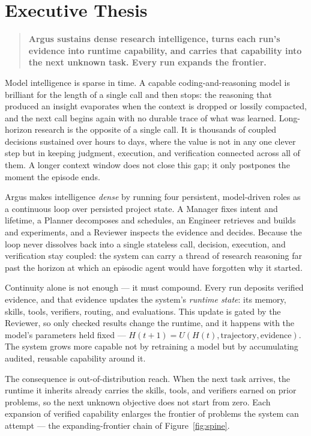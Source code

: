 \section{Executive Thesis}
\label{sec:thesis}

\begin{quote}
\large\bfseries
Argus sustains dense research intelligence, turns each run's evidence into
runtime capability, and carries that capability into the next unknown task.
Every run expands the frontier.
\end{quote}

Model intelligence is sparse in time. A capable coding-and-reasoning model is
brilliant for the length of a single call and then stops: the reasoning that
produced an insight evaporates when the context is dropped or lossily compacted,
and the next call begins again with no durable trace of what was learned. Long-horizon
research is the opposite of a single call. It is thousands of coupled decisions
sustained over hours to days, where the value is not in any one clever step but in
keeping judgment, execution, and verification connected across all of them. A
longer context window does not close this gap; it only postpones the moment the
episode ends.

Argus makes intelligence \emph{dense} by running four persistent, model-driven
roles as a continuous loop over persisted project state. A Manager fixes intent
and lifetime, a Planner decomposes and schedules, an Engineer retrieves and builds
and experiments, and a Reviewer inspects the evidence and decides. Because the
loop never dissolves back into a single stateless call, decision, execution, and
verification stay coupled: the system can carry a thread of research reasoning far
past the horizon at which an episodic agent would have forgotten why it started.

Continuity alone is not enough --- it must compound. Every run deposits verified
evidence, and that evidence updates the system's \emph{runtime state}: its memory,
skills, tools, verifiers, routing, and evaluations. This update is gated by the
Reviewer, so only checked results change the runtime, and it happens with the
model's parameters held fixed --- $H(t{+}1) = U(H(t), \text{trajectory},
\text{evidence})$. The system grows more capable not by retraining a model but by
accumulating audited, reusable capability around it.

The consequence is out-of-distribution reach. When the next task arrives, the
runtime it inherits already carries the skills, tools, and verifiers earned on
prior problems, so the next unknown objective does not start from zero. Each
expansion of verified capability enlarges the frontier of problems the system can
attempt --- the expanding-frontier chain of Figure~\ref{fig:spine}.

